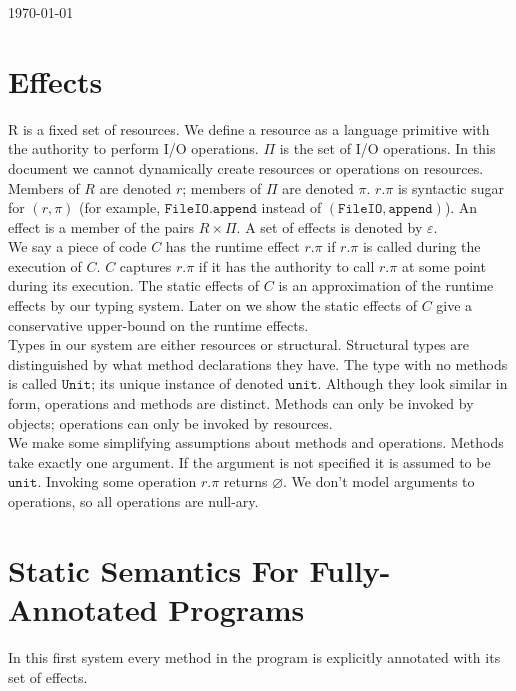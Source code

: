 \documentclass{llncs}
\newcommand{\keywadj}[1]{\mathtt{#1}}
\begin{document}
\today
\section{Effects}

\noindent
R is a fixed set of resources. We define a resource as a language primitive with the authority to perform I/O operations. $\Pi$ is the set of I/O operations. In this document we cannot dynamically create resources or operations on resources.\\

\noindent
Members of $R$ are denoted $r$; members of $\Pi$ are denoted $\pi$. $r.\pi$ is syntactic sugar for $(r,\pi)$ (for example, $\keywadj{FileIO.append}$ instead of $\keywadj{(FileIO, append)}$). An effect is a member of the pairs $R \times \Pi$. A set of effects is denoted by $\varepsilon$. \\

\noindent
We say a piece of code $C$ has the runtime effect $r.\pi$ if $r.\pi$ is called during the execution of $C$. $C$ captures $r.\pi$ if it has the authority to call $r.\pi$ at some point during its execution. The static effects of $C$ is an approximation of the runtime effects by our typing system. Later on we show the static effects of $C$ give a conservative upper-bound on the runtime effects. \\

\noindent
Types in our system are either resources or structural. Structural types are distinguished by what method declarations they have. The type with no methods is called $\keywadj{Unit}$; its unique instance of denoted $\keywadj{unit}$. Although they look similar in form, operations and methods are distinct. Methods can only be invoked by objects; operations can only be invoked by resources. \\

\noindent
We make some simplifying assumptions about methods and operations. Methods take exactly one argument. If the argument is not specified it is assumed to be $\keywadj{unit}$. Invoking some operation $r.\pi$ returns $\varnothing$. We don't model arguments to operations, so all operations are null-ary.


\section{Static Semantics For Fully-Annotated Programs}

\noindent
In this first system every method in the program is explicitly annotated with its set of effects.
\end{document}
